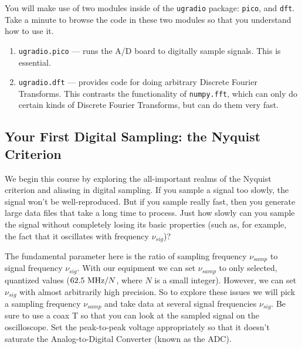 \documentclass[12pt,preprint]{aastex}
\begin{document}
You will make use of two modules inside of the {\tt ugradio} package: {\tt pico}, and {\tt dft}.
Take a minute to browse the code in these two modules so that you understand how to use it.

\begin{enumerate}

\item {\tt ugradio.pico} --- runs the A/D board to digitally sample signals. This is essential.

\item {\tt ugradio.dft} --- provides code for doing arbitrary Discrete Fourier Transforms.  This
contrasts the functionality of {\tt numpy.fft}, which can only do certain kinds of
Discrete Fourier Transforms, but can do them very fast.



\end{enumerate}


\subsection{Your First Digital Sampling: the Nyquist Criterion}

We begin this course by exploring the all-important realms of the
Nyquist criterion and aliasing in digital sampling.  If you
sample a signal too slowly, the signal won't be well-reproduced.  But if you
sample really fast, then you generate large data files that take a long
time to process.  Just how slowly can you sample the signal without
completely losing its basic properties (such as, for example, the fact
that it oscillates with frequency $\nu_{sig}$)?

The fundamental parameter here is the ratio of sampling frequency
$\nu_{samp}$ to signal frequency $\nu_{sig}$. With our equipment we can
set $\nu_{samp}$ to only selected, quantized values ($62.5~{\rm MHz} / N$, where
$N$ is a small integer). However, we can set
$\nu_{sig}$ with almost arbitrarily high precision. So to explore these
issues we will pick a sampling frequency $\nu_{samp}$ and take data at
several signal frequencies $\nu_{sig}$.  Be sure to use a coax T so that
you can look at the sampled signal on the oscilloscope.  Set the
peak-to-peak voltage appropriately so that it doesn't saturate the
Analog-to-Digital Converter (known as the ADC). 
\end{document}
